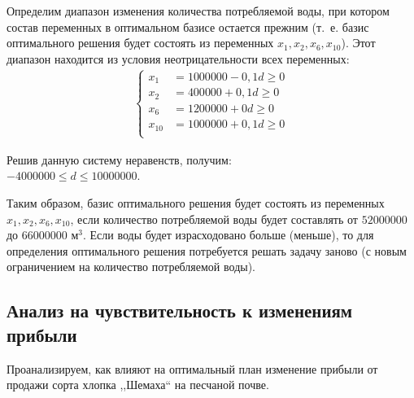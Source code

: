 Определим диапазон изменения количества потребляемой воды, при котором состав переменных в оптимальном базисе остается прежним (т.~е. базис оптимального решения будет состоять из переменных $ x_1, x_2, x_6, x_{10} $). Этот диапазон находится из условия неотрицательности всех переменных:
\begin{equation}
	\begin{aligned}
  	\left\{
    	\begin{aligned}
	      x_1 & = 1 000 000 - 0,1d \ge 0 \\
	      x_2 & = 400 000 + 0,1d \ge 0\\
	      x_6 & = 1 200 000 + 0d \ge 0 \\
	      x_{10} & = 1 000 000 + 0,1d \ge 0\\ 
    	\end{aligned}
  	\right.
	\end{aligned}
\end{equation}

Решив данную систему неравенств, получим: \\
$ -4 000 000 \le d \le 10 000 000 $.

Таким образом, базис оптимального решения будет состоять из переменных $ x_1, x_2, x_6, x_{10} $, если количество потребляемой воды будет составлять от $ 52 000 000 $ до $ 66 000 000 $ $ \text{м}^3 $. Если воды будет израсходовано больше (меньше), то для определения оптимального решения потребуется решать задачу заново (с новым ограничением на количество потребляемой воды).




\subsection{Анализ на чувствительность к изменениям прибыли}

Проанализируем, как влияют на оптимальный план изменение прибыли от продажи сорта хлопка ,,Шемаха`` на песчаной почве.

